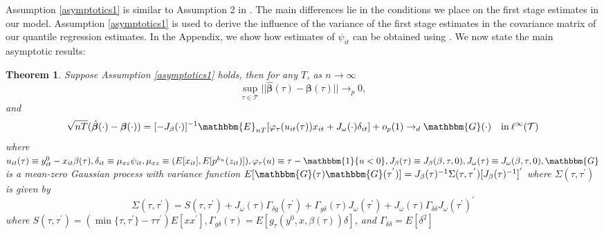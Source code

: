 \documentclass[11pt]{article}
\newtheorem{theorem}{Theorem}[section]
\begin{document}
Assumption \ref{asymptotics1} is similar to Assumption 2 in \cite{Chernozhukov2006}. The main differences lie in the conditions we place on the first stage estimates in our model. Assumption \ref{asymptotics1} is used to derive the influence of the variance of the first stage estimates in the covariance matrix of our quantile regression estimates. In the Appendix, we show how estimates of $\psi_{it}$ can be obtained using \cite{Ackerberg2014}. We now state the main asymptotic results:
\begin{theorem}
Suppose Assumption \ref{asymptotics1} holds, then for any $T$, as $n\rightarrow\infty$
\begin{equation*}
\underset{\tau\in\mathcal{T}}{\operatorname{\sup}}||\hat{\boldsymbol{\beta}}(\tau)-\boldsymbol{\beta}(\tau)||\rightarrow_{p} 0,
\end{equation*}
and
\begin{equation*}
\sqrt{nT}(\hat{\boldsymbol{\beta}}(\cdot)-\boldsymbol{\beta}(\cdot))=[-J_{\beta}(\cdot)]^{-1}\mathbbm{E}_{nT}[\varphi_{\tau}(u_{it}(\tau))x_{it}+J_{\omega}(\cdot)\delta_{it}]+o_{p}(1)\rightarrow_{d} \mathbbm{G}(\cdot) \quad \text{in}\: \ell^{\infty}(\mathcal{T})
\end{equation*}
where $u_{it}(\tau)\equiv y^{0}_{it}-x_{it}\beta(\tau), \delta_{it}\equiv\mu_{xz}\psi_{it}, \mu_{xz}\equiv(E[x_{it}], E[p^{k_{n}}(z_{it})]), \varphi_{\tau}(u)\equiv\tau-\mathbbm{1}\{u<0\}, J_{\beta}(\tau)\equiv J_{\beta}(\beta, \tau, 0), J_{\omega}(\tau)\equiv J_{\omega}(\beta, \tau, 0), \mathbbm{G}$ is a mean-zero Gaussian process with variance function $E[\mathbbm{G}(\tau)\mathbbm{G}(\tau^{'})]=J_{\beta}(\tau)^{-1}\Sigma(\tau, \tau^{'})[J_{\beta}(\tau)^{-1}]^{'}$ where $\Sigma(\tau, \tau^{'})$ is given by
\begin{equation*}
\Sigma(\tau, \tau^{'})=S(\tau,\tau^{'})+J_{\omega}(\tau)\Gamma_{\delta g}(\tau^{'})+\Gamma_{g\delta}(\tau)J_{\omega}(\tau^{'})+J_{\omega}(\tau)\Gamma_{\delta\delta}J_{\omega}(\tau^{'})^{'}
\end{equation*}
where $S(\tau,\tau^{'})=(\min\{\tau,\tau^{'}\}-\tau\tau^{'})E[xx^{'}], \Gamma_{g\delta}(\tau)=E[g_{\tau}(y^{0},x,\beta(\tau))\delta]$, and $\Gamma_{\delta\delta}=E[\delta^{2}]$
\end{theorem}
\end{document}
